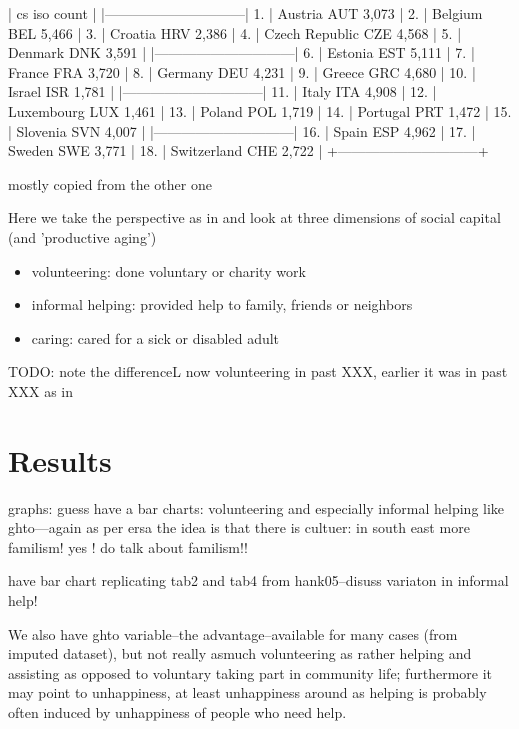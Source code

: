 \documentclass[10pt, letterpaper]{article}
\begin{document}
\begin{spacing}{1.4}
     |             cs   iso   count |
     |------------------------------|
  1. |        Austria   AUT   3,073 |
  2. |        Belgium   BEL   5,466 |
  3. |        Croatia   HRV   2,386 |
  4. | Czech Republic   CZE   4,568 |
  5. |        Denmark   DNK   3,591 |
     |------------------------------|
  6. |        Estonia   EST   5,111 |
  7. |         France   FRA   3,720 |
  8. |        Germany   DEU   4,231 |
  9. |         Greece   GRC   4,680 |
 10. |         Israel   ISR   1,781 |
     |------------------------------|
 11. |          Italy   ITA   4,908 |
 12. |     Luxembourg   LUX   1,461 |
 13. |         Poland   POL   1,719 |
 14. |       Portugal   PRT   1,472 |
 15. |       Slovenia   SVN   4,007 |
     |------------------------------|
 16. |          Spain   ESP   4,962 |
 17. |         Sweden   SWE   3,771 |
 18. |    Switzerland   CHE   2,722 |
     +------------------------------+


mostly copied from the other one

Here we take the perspective as in \citet{hank10} and look at three dimensions
of social capital (and 'productive aging') %
\begin{itemize}
\item volunteering:  done voluntary or charity work
\item informal helping: provided help to family, friends or neighbors
\item caring: cared for a sick or disabled adult 
\end{itemize}

TODO: note the differenceL now volunteering in past XXX, earlier it was in past
XXX as in \citet{haski09}

\section{Results}

graphs: guess have a bar charts: volunteering and especially informal helping
like ghto---again as per ersa the idea is that there is cultuer: in south east
more familism! yes ! do talk about familism!!

have bar chart replicating tab2 and tab4 from hank05--disuss variaton in
informal help!

We also have ghto variable--the advantage--available for many cases (from
imputed dataset), but not really asmuch volunteering as rather helping and
assisting as opposed to voluntary taking part in community life; furthermore it
may point to unhappiness, at least unhappiness around as helping is probably
often induced by unhappiness of people who need help.  



\end{spacing}
\end{document}
